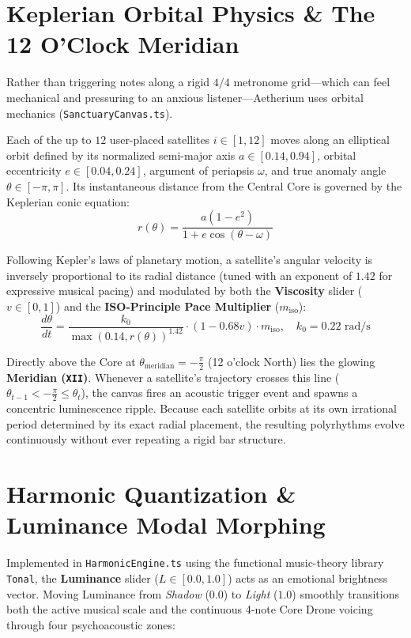 \documentclass[11pt,oneside,openany]{book}
\begin{document}
\section{Keplerian Orbital Physics \& The 12 O'Clock Meridian}

Rather than triggering notes along a rigid $4/4$ metronome grid---which can feel mechanical and pressuring to an anxious listener---Aetherium uses orbital mechanics (\texttt{SanctuaryCanvas.ts}).

Each of the up to $12$ user-placed satellites $i \in [1, 12]$ moves along an elliptical orbit defined by its normalized semi-major axis $a \in [0.14, 0.94]$, orbital eccentricity $e \in [0.04, 0.24]$, argument of periapsis $\omega$, and true anomaly angle $\theta \in [-\pi, \pi]$. Its instantaneous distance from the Central Core is governed by the Keplerian conic equation:
\[
  r(\theta) = \frac{a(1 - e^2)}{1 + e \cos(\theta - \omega)}
\]

Following Kepler's laws of planetary motion, a satellite's angular velocity is inversely proportional to its radial distance (tuned with an exponent of $1.42$ for expressive musical pacing) and modulated by both the \textbf{Viscosity} slider ($v \in [0, 1]$) and the \textbf{ISO-Principle Pace Multiplier} ($m_{\text{iso}}$):
\[
  \frac{d\theta}{dt} = \frac{k_0}{\max(0.14, r(\theta))^{1.42}} \cdot (1 - 0.68v) \cdot m_{\text{iso}}, \quad k_0 = 0.22\text{ rad/s}
\]

Directly above the Core at $\theta_{\text{meridian}} = -\frac{\pi}{2}$ (12 o'clock North) lies the glowing \textbf{Meridian (\texttt{XII})}. Whenever a satellite's trajectory crosses this line ($\theta_{t-1} < -\frac{\pi}{2} \le \theta_t$), the canvas fires an acoustic trigger event and spawns a concentric luminescence ripple. Because each satellite orbits at its own irrational period determined by its exact radial placement, the resulting polyrhythms evolve continuously without ever repeating a rigid bar structure.

\section{Harmonic Quantization \& Luminance Modal Morphing}

Implemented in \texttt{HarmonicEngine.ts} using the functional music-theory library \texttt{Tonal}, the \textbf{Luminance} slider ($L \in [0.0, 1.0]$) acts as an emotional brightness vector. Moving Luminance from \textit{Shadow} ($0.0$) to \textit{Light} ($1.0$) smoothly transitions both the active musical scale and the continuous 4-note Core Drone voicing through four psychoacoustic zones:
\end{document}
